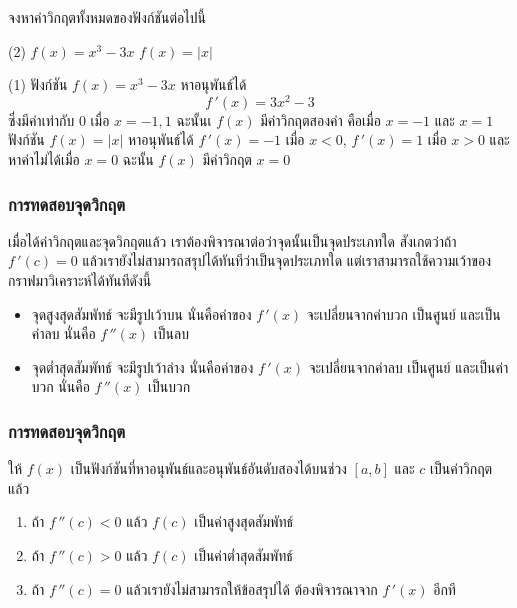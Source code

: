 \begin{frame}[t]
\begin{ex}
จงหาค่าวิกฤตทั้งหมดของฟังก์ชันต่อไปนี้
\begin{tasks}(2)
\task $f(x) = x^3-3x$
\task $f(x) = |x|$
\end{tasks}
\end{ex}
\begin{sol}
\begin{tasks}(1)
\task ฟังก์ชัน $f(x) = x^3-3x$ \pa หาอนุพันธ์ได้ 
\[f\,'(x) = 3x^2-3\] \pa 
ซึ่งมีค่าเท่ากับ $0$ เมื่อ $x =-1, 1$ \pa ฉะนั้นเ $f(x)$ มีค่าวิกฤตสองค่า คือเมื่อ $x = -1$ และ $x=1$ \pa
\task ฟังก์ชัน $f(x) = |x|$ \pa หาอนุพันธ์ได้ $f\,'(x) = -1$ เมื่อ $x<0$, $f\,'(x) = 1$ เมื่อ $x> 0$ และหาค่าไม่ได้เมื่อ $x=0$ ฉะนั้น $f(x)$ มีค่าวิกฤต $x=0$ 
\end{tasks}
\end{sol}
\end{frame}

\begin{frame}
\frametitle{การทดสอบจุดวิกฤต}
เมื่อได้ค่าวิกฤตและจุดวิกฤตแล้ว เราต้องพิจารณาต่อว่าจุดนั้นเป็นจุดประเภทใด สังเกตว่าถ้า $f\,'(c) = 0$ แล้วเรายังไม่สามารถสรุปได้ทันทีว่าเป็นจุดประเภทใด แต่เราสามารถใช้ความเว้าของกราฟมาวิเคราะห์ได้ทันทีดังนี้
\begin{itemize}
\item จุดสูงสุดสัมพัทธ์ จะมีรูปเว้าบน นั่นคือค่าของ $f\,'(x)$ จะเปลี่ยนจากค่าบวก เป็นศูนย์ และเป็นค่าลบ นั่นคือ $f\,''(x)$ เป็นลบ
\item จุดต่ำสุดสัมพัทธ์ จะมีรูปเว้าล่าง นั่นคือค่าของ $f\,'(x)$ จะเปลี่ยนจากค่าลบ เป็นศูนย์ และเป็นค่าบวก นั่นคือ $f\,''(x)$ เป็นบวก
\end{itemize}
\end{frame}

\begin{frame}
\frametitle{การทดสอบจุดวิกฤต}
\begin{thm}{}{}
ให้ $f(x)$ เป็นฟังก์ชันที่หาอนุพันธ์และอนุพันธ์อันดับสองได้บนช่วง $[a,b]$ \pa และ $c$ เป็นค่าวิกฤตแล้ว\pa
\begin{enumerate}
\item ถ้า $f\,''(c) < 0$ แล้ว $f(c)$ เป็นค่าสูงสุดสัมพัทธ์\pa
\item ถ้า $f\,''(c) > 0$ แล้ว $f(c)$ เป็นค่าต่ำสุดสัมพัทธ์\pa
\item ถ้า $f\,''(c) = 0$ แล้วเรายังไม่สามารถให้ข้อสรุปได้ ต้องพิจารณาจาก $f\,'(x)$ อีกที
\end{enumerate}
\end{thm}
\end{frame}


